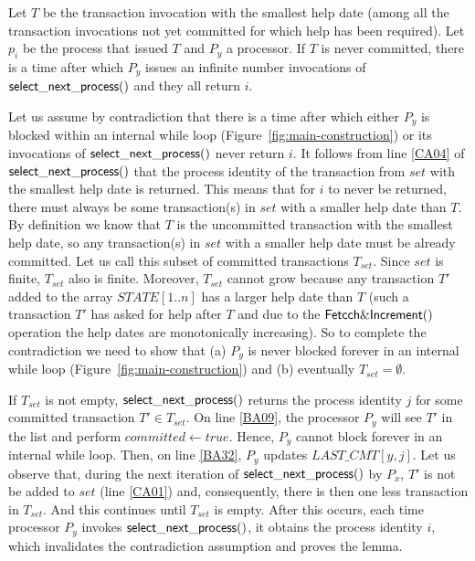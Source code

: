 \begin{lemma}
\label{lemma:help-commit-1}

Let $T$ be the  transaction invocation  with  the smallest help date
(among all the transaction invocations not yet committed
for which help has been required). Let $p_i$ be the process that issued $T$
and $P_y$ a processor.
If $T$ is never committed, there is a time after which $P_y$ issues an 
infinite number invocations of ${\sf select\_next\_process}()$ 
and they all return $i$. 
\end{lemma}

\begin{proofL}
Let us assume by contradiction that there is a time after which
either $P_y$ is blocked within an internal while loop 
(Figure~\ref{fig:main-construction})  or its
invocations of ${\sf select\_next\_process}()$   never  return $i$. 
It follows from line \ref{CA04} of ${\sf  select\_next\_process}()$  that
the process identity  of the transaction from $set$  with the smallest help
date is returned. 
This means  that for $i$  to never be  returned, there must always  be some 
transaction(s) in $set$ with a smaller help date than $T$. 
By  definition we know  that $T$  is the  uncommitted transaction  with the
smallest help date, so any transaction(s) in $set$ with a smaller help date
must be  already committed. 
Let us call  this subset of committed  transactions  $T_{set}$. 
Since $set$ is finite, $T_{set}$ also is  finite.  
Moreover,   $T_{set}$ cannot grow because any  transaction $T'$ added to
the array $\mathit{STATE}[1..n]$ has  a larger help date than $T$
(such a transaction $T'$ has  asked for help after $T$
and  due to the  ${\sf Fetcch\&Increment}()$  operation the  help  dates 
are  monotonically increasing).  
So  to complete  the contradiction  we  need to  show that 
(a) $P_y$  is never blocked forever in an internal while loop 
(Figure~\ref{fig:main-construction})
and (b) eventually $T_{set} = \emptyset$. 

If $T_{set}$  is not empty, ${\sf  select\_next\_process}()$  returns
the process identity $j$ for some committed transaction $T'\in T_{set}$. 
On line  \ref{BA09}, the processor 
$P_y$ will see $T'$  in the list and perform $committed \gets true$. 
Hence, $P_y$ cannot block forever in an internal while loop. 
Then, on line \ref{BA32}, $P_y$  updates  $\mathit{LAST\_CMT}[y,j]$.
Let  us   observe  that,  during  the   next   iteration   of  
${\sf select\_next\_process}()$ by $P_x$,  $T'$ is not be added to  $set$ 
(line  \ref{CA01}) and, consequently, 
there is then  one less  transaction in $T_{set}$. And this
continues until $T_{set}$ is empty.  After this occurs,   
each time processor $P_y$ invokes ${\sf  select\_next\_process}()$,  it
obtains the process identity $i$, which invalidates the contradiction 
assumption and proves the lemma. 
\renewcommand{\toto}{lemma:help-commit-1}
\end{proofL}


